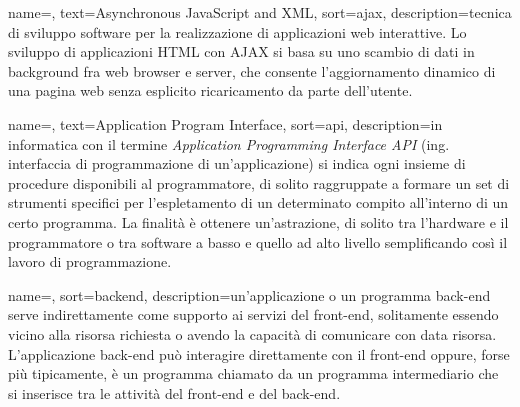 	





{
	name=,
	text=Asynchronous JavaScript and XML,
	sort=ajax,
	description={tecnica di sviluppo software per la realizzazione di applicazioni web interattive. Lo sviluppo di applicazioni HTML con AJAX si basa su uno scambio di dati in background fra web browser e server, che consente l'aggiornamento dinamico di una pagina web senza esplicito ricaricamento da parte dell'utente.}
}

{
    name=,
    text=Application Program Interface,
    sort=api,
    description={in informatica con il termine \emph{Application Programming Interface API} (ing. interfaccia di programmazione di un'applicazione) si indica ogni insieme di procedure disponibili al programmatore, di solito raggruppate a formare un set di strumenti specifici per l'espletamento di un determinato compito all'interno di un certo programma. La finalità è ottenere un'astrazione, di solito tra l'hardware e il programmatore o tra software a basso e quello ad alto livello semplificando così il lavoro di programmazione.}
}

{
	name=,
	sort=backend,
	description={un'applicazione o un programma back-end serve indirettamente come supporto ai servizi del front-end, solitamente essendo vicino alla risorsa richiesta o avendo la capacità di comunicare con data risorsa. L'applicazione back-end può interagire direttamente con il front-end oppure, forse più tipicamente, è un programma chiamato da un programma intermediario che si inserisce tra le attività del front-end e del back-end.}
}

